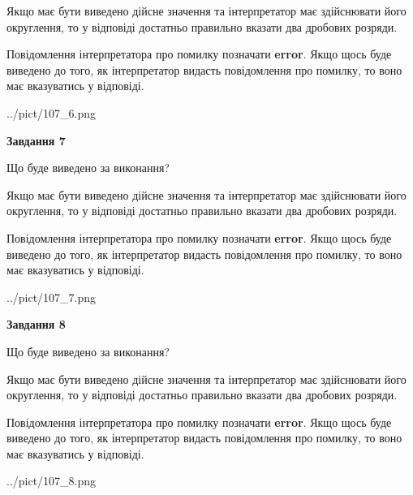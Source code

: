 \documentclass[12pt, ukrainian]{article}
\begin{document}
{\begin {Large}
Якщо має бути виведено дійсне значення та інтерпретатор має здійснювати його округлення, 
то у відповіді достатньо правильно вказати два дробових розряди.

Повідомлення інтерпретатора про помилку позначати \textbf{error}.
Якщо щось буде виведено до того, як інтерпретатор видасть повідомлення про помилку, 
то воно має вказуватись у відповіді. \par

\begin{center}
	{../pict/107_6.png}
\end{center}
\newpage

{\begin {center}\textbf{Завдання 7}\end {center}}\par
Що буде виведено за виконання? \par

Якщо має бути виведено дійсне значення та інтерпретатор має здійснювати його округлення, 
то у відповіді достатньо правильно вказати два дробових розряди.

Повідомлення інтерпретатора про помилку позначати \textbf{error}.
Якщо щось буде виведено до того, як інтерпретатор видасть повідомлення про помилку, 
то воно має вказуватись у відповіді. \par

\begin{center}
	{../pict/107_7.png}
\end{center}
\newpage

{\begin {center}\textbf{Завдання 8}\end {center}}\par
Що буде виведено за виконання? \par

Якщо має бути виведено дійсне значення та інтерпретатор має здійснювати його округлення, 
то у відповіді достатньо правильно вказати два дробових розряди.

Повідомлення інтерпретатора про помилку позначати \textbf{error}.
Якщо щось буде виведено до того, як інтерпретатор видасть повідомлення про помилку, 
то воно має вказуватись у відповіді. \par

\begin{center}
	{../pict/107_8.png}
\end{center}
\newpage


\end{Large}}
\end{document}
